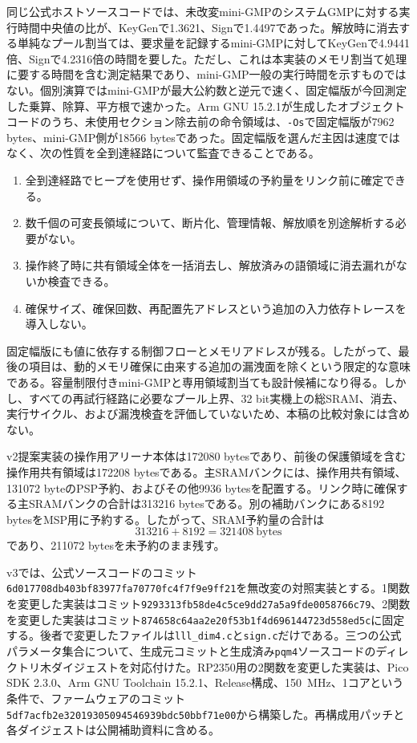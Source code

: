 \documentclass[a4paper,10pt]{ltjsarticle}
\theoremstyle{definition}
\theoremstyle{remark}
\begin{document}
同じ公式ホストソースコードでは、未改変mini-GMPのシステムGMPに対する実行時間中央値の比が、KeyGenで\num{1.3621}、Signで\num{1.4497}であった。解放時に消去する単純なプール割当ては、要求量を記録するmini-GMPに対してKeyGenで\num{4.9441}倍、Signで\num{4.2316}倍の時間を要した。ただし、これは本実装のメモリ割当て処理に要する時間を含む測定結果であり、mini-GMP一般の実行時間を示すものではない。個別演算ではmini-GMPが最大公約数と逆元で速く、固定幅版が今回測定した乗算、除算、平方根で速かった。Arm GNU 15.2.1が生成したオブジェクトコードのうち、未使用セクション除去前の命令領域は、\texttt{-Os}で固定幅版が\num{7962} bytes、mini-GMP側が\num{18566} bytesであった。固定幅版を選んだ主因は速度ではなく、次の性質を全到達経路について監査できることである。

\begin{enumerate}[leftmargin=2.2em]
  \item 全到達経路でヒープを使用せず、操作用領域の予約量をリンク前に確定できる。
  \item 数千個の可変長領域について、断片化、管理情報、解放順を別途解析する必要がない。
  \item 操作終了時に共有領域全体を一括消去し、解放済みの語領域に消去漏れがないか検査できる。
  \item 確保サイズ、確保回数、再配置先アドレスという追加の入力依存トレースを導入しない。
\end{enumerate}

固定幅版にも値に依存する制御フローとメモリアドレスが残る。したがって、最後の項目は、動的メモリ確保に由来する追加の漏洩面を除くという限定的な意味である。容量制限付きmini-GMPと専用領域割当ても設計候補になり得る。しかし、すべての再試行経路に必要なプール上界、32 bit実機上の総SRAM、消去、実行サイクル、および漏洩検査を評価していないため、本稿の比較対象には含めない。

v2提案実装の操作用アリーナ本体は\num{172080} bytesであり、前後の保護領域を含む操作用共有領域は\num{172208} bytesである。主SRAMバンクには、操作用共有領域、\num{131072} byteのPSP予約、およびその他\num{9936} bytesを配置する。リンク時に確保する主SRAMバンクの合計は\num{313216} bytesである。別の補助バンクにある\num{8192} bytesをMSP用に予約する。したがって、SRAM予約量の合計は
\begin{equation}
  \num{313216}+\num{8192}=\num{321408}\ \text{bytes}
\end{equation}
であり、\num{211072} bytesを未予約のまま残す。

v3では、公式ソースコードのコミット\texttt{6d017708db403bf83977fa70770fc4f7f9e9ff21}を無改変の対照実装とする。1関数を変更した実装はコミット\texttt{9293313fb58de4c5ce9dd27a5a9fde0058766c79}、2関数を変更した実装はコミット\texttt{874658c64aa2e20f53b1f4d696144723d558ed5c}に固定する。後者で変更したファイルは\texttt{lll\_dim4.c}と\texttt{sign.c}だけである。三つの公式パラメータ集合について、生成元コミットと生成済み\texttt{pqm4}ソースコードのディレクトリ木ダイジェストを対応付けた。RP2350用の2関数を変更した実装は、Pico SDK 2.3.0、Arm GNU Toolchain 15.2.1、Release構成、\SI{150}{\mega\hertz}、1コアという条件で、ファームウェアのコミット\texttt{5df7acfb2e32019305094546939bdc50bbf71e00}から構築した。再構成用パッチと各ダイジェストは公開補助資料に含める。
\end{document}
